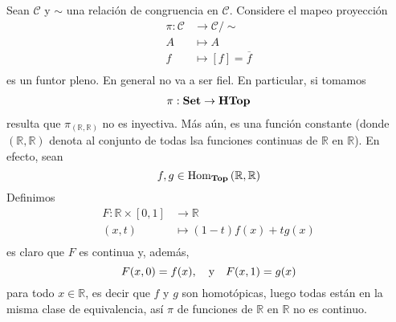 \documentclass[12pt]{report}
\newcounter{it}
\theoremstyle{largebreak}
\newcommand{\Hom}[3]{\ensuremath{\textup{Hom}_{#1}\left(#2,#3\right)}}
\newcommand{\Cat}[1]{\ensuremath{\textup{\textbf{#1}}}}
\begin{document}
    \begin{exa}
        Sean $\mathcal{C}$ y $\sim$ una relación de congruencia en $\mathcal{C}$. Considere el mapeo proyección
        \begin{equation*}
            \begin{split}
                \pi:\mathcal{C}&\rightarrow\mathcal{C}/\sim\\
                A&\mapsto A\\
                f&\mapsto\left[f\right]=\overline{f}\\
            \end{split}
        \end{equation*}
        es un funtor pleno. En general no va a ser fiel. En particular, si tomamos
        \begin{equation*}
            \begin{split}
                \pi:\Cat{Set}&\rightarrow\Cat{HTop}\\
            \end{split}
        \end{equation*}
        resulta que $\pi_{(\mathbb{R},\mathbb{R})}$ no es inyectiva. Más aún, es una función constante (donde $(\mathbb{R},\mathbb{R})$ denota al conjunto de todas lsa funciones continuas de $\mathbb{R}$ en $\mathbb{R}$). En efecto, sean
        \begin{equation*}
            f,g\in\Hom{\Cat{Top}}{\mathbb{R}}{\mathbb{R}}
        \end{equation*}
        Definimos
        \begin{equation*}
            \begin{split}
                F:\mathbb{R}\times[0,1]&\rightarrow\mathbb{R}\\
                (x,t)&\mapsto (1-t)f(x)+tg(x)\\
            \end{split}
        \end{equation*}
        es claro que $F$ es continua y, además,
        \begin{equation*}
            F(x,0)=f(x),\quad\textup{y}\quad F(x,1)=g(x)
        \end{equation*}
        para todo $x\in\mathbb{R}$, es decir que $f$ y $g$ son homotópicas, luego todas están en la misma clase de equivalencia, así $\pi$ de funciones de $\mathbb{R}$ en $\mathbb{R}$ no es continuo.
    \end{exa}
\end{document}
